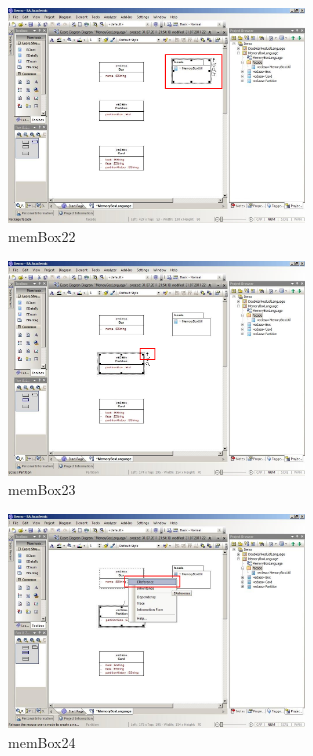 \begin{figure}[htbp]
	\centering
  \includegraphics[width=0.7\textwidth]{pics/memBox22.png}
	\caption{memBox22}
	\label{memBox22}
\end{figure}

\begin{figure}[htbp]
	\centering
  \includegraphics[width=0.7\textwidth]{pics/memBox23.png}
	\caption{memBox23}
	\label{memBox23}
\end{figure}

\begin{figure}[htbp]
	\centering
  \includegraphics[width=0.7\textwidth]{pics/memBox24.png}
	\caption{memBox24}
	\label{memBox24}
\end{figure}

